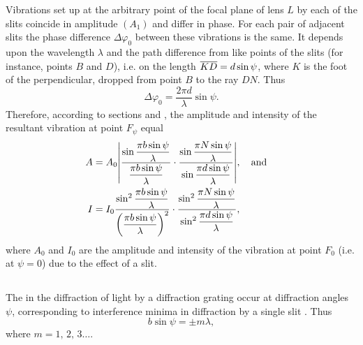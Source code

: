 Vibrations set up at the arbitrary point of the focal plane
of lens $L$ by each of the slits coincide in amplitude $(A_{1})$ and differ in phase. For each pair of adjacent slits the phase difference $\Delta \varphi_{0}$ between these vibrations is the same. It depends upon the wavelength $\lambda$ and the path difference from like points of the
slits (for instance, points $B$ and $D$), i.e. on the length $\overline{KD} = d \sin \psi$, where $K$ is the foot of the perpendicular, dropped from point $B$ to the ray $DN$. Thus
\begin{equation*}%
\Delta \varphi_{0} = \frac{2 \pi d}{\lambda} \sin \psi.
\end{equation*}
Therefore, according to sections  and , the amplitude and intensity of the resultant vibration at point $F_{\psi}$ equal 
\begin{align*}
A &= A_{0} \abs{\frac{\sin \dfrac{\pi b \sin \psi}{\lambda}}{\dfrac{\pi b \sin \psi}{\lambda}} \cdot \frac{\sin \dfrac{\pi N \sin \psi}{\lambda}}{\sin \dfrac{\pi d \sin \psi}{\lambda}}}, \qand \\  
I &= I_{0} \frac{\sin^{2} \dfrac{\pi b \sin \psi}{\lambda}}{\left(\dfrac{\pi b \sin \psi}{\lambda}\right)^{2}} \cdot \frac{\sin^{2} \dfrac{\pi N \sin \psi}{\lambda}}{\sin^{2} \dfrac{\pi d \sin \psi}{\lambda}},
\end{align*}
where $A_{0}$ and $I_{0}$ are the amplitude and intensity of the vibration at point $F_{0}$ (i.e. at $\psi = 0$) due to the effect of a  slit.

\subsection{}\label{33.3.5} The  in the diffraction of light by a diffraction grating occur at diffraction angles $\psi$, corresponding to interference minima in diffraction by a single slit .
Thus
\begin{equation*}%
b \sin \psi = \pm m\lambda,
\end{equation*}
where $m = 1,\,2, \, 3 \dots{}$.

